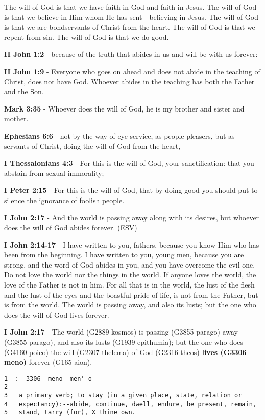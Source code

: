 \documentclass[11pt]{article}
\begin{document}
The will of God is that we have faith in God and faith in Jesus.
The will of God is that we believe in Him whom He has sent - believing in Jesus.
The will of God is that we are bondservants of Christ from the heart.
The will of God is that we repent from sin.
The will of God is that we do good.

\textbf{II John 1:2} - because of the truth that abides in us and will be with us forever:

\textbf{II John 1:9} - Everyone who goes on ahead and does not abide in the teaching of Christ, does not have God. Whoever abides in the teaching has both the Father and the Son.

\textbf{Mark 3:35} - Whoever does the will of God, he is my brother and sister and mother.

\textbf{Ephesians 6:6} - not by the way of eye-service, as people-pleasers, but as servants of Christ, doing the will of God from the heart,

\textbf{I Thessalonians 4:3} - For this is the will of God, your sanctification: that you abstain from sexual immorality;

\textbf{I Peter 2:15} - For this is the will of God, that by doing good you should put to silence the ignorance of foolish people.

\textbf{I John 2:17} - And the world is passing away along with its desires, but whoever does the will of God abides forever. (ESV)

\textbf{I John 2:14-17} - I have written to you, fathers, because you know Him who has been from the beginning. I have written to you, young men, because you are strong, and the word of God abides in you, and you have overcome the evil one.  Do not love the world nor the things in the world. If anyone loves the world, the love of the Father is not in him.  For all that is in the world, the lust of the flesh and the lust of the eyes and the boastful pride of life, is not from the Father, but is from the world.  The world is passing away, and also its lusts; but the one who does the will of God lives forever.

\textbf{I John 2:17} - The world (G2889 kosmos) is passing (G3855 parago) away (G3855 parago), and also its lusts (G1939 epithumia); but the one who does (G4160 poieo) the will (G2307 thelema) of God (G2316 theos) \textbf{lives (G3306 meno)} forever (G165 aion).

\begin{verbatim}
1  :  3306  meno  men'-o
2  
3   a primary verb; to stay (in a given place, state, relation or
4   expectancy):--abide, continue, dwell, endure, be present, remain,
5   stand, tarry (for), X thine own.
\end{verbatim}
\end{document}
